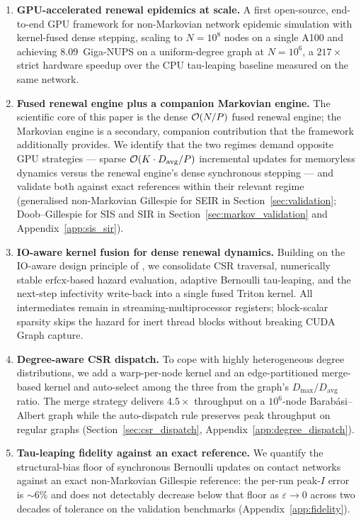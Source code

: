 \begin{enumerate}
    \item \textbf{GPU-accelerated renewal epidemics at scale.} A first open-source, end-to-end GPU framework for non-Markovian network epidemic simulation with kernel-fused dense stepping, scaling to $N = 10^8$ nodes on a single A100 and achieving 8.09~Giga-NUPS on a uniform-degree graph at $N = 10^6$, a $217\times$ strict hardware speedup over the CPU tau-leaping baseline measured on the same network.

    \item \textbf{Fused renewal engine plus a companion Markovian engine.} The scientific core of this paper is the dense $\mathcal{O}(N/P)$ fused renewal engine; the Markovian engine is a secondary, companion contribution that the framework additionally provides. We identify that the two regimes demand opposite GPU strategies --- sparse $\mathcal{O}(K \cdot D_{\mathrm{avg}}/P)$ incremental updates for memoryless dynamics versus the renewal engine's dense synchronous stepping --- and validate both against exact references within their relevant regime (generalised non-Markovian Gillespie for SEIR in Section~\ref{sec:validation}; Doob--Gillespie for SIS and SIR in Section~\ref{sec:markov_validation} and Appendix~\ref{app:sis_sir}).

    \item \textbf{IO-aware kernel fusion for dense renewal dynamics.} Building on the IO-aware design principle of \citet{dao2022flashattention}, we consolidate CSR traversal, numerically stable $\mathrm{erfcx}$-based hazard evaluation, adaptive Bernoulli tau-leaping, and the next-step infectivity write-back into a single fused Triton kernel. All intermediates remain in streaming-multiprocessor registers; block-scalar sparsity skips the hazard for inert thread blocks without breaking CUDA Graph capture.

    \item \textbf{Degree-aware CSR dispatch.} To cope with highly heterogeneous degree distributions, we add a warp-per-node kernel and an edge-partitioned merge-based kernel \citep{merrill2016merge} and auto-select among the three from the graph's $D_{\max}/D_{\mathrm{avg}}$ ratio. The merge strategy delivers $4.5\times$ throughput on a $10^6$-node Barab\'{a}si--Albert graph while the auto-dispatch rule preserves peak throughput on regular graphs (Section~\ref{sec:csr_dispatch}, Appendix~\ref{app:degree_dispatch}).

    \item \textbf{Tau-leaping fidelity against an exact reference.} We quantify the structural-bias floor of synchronous Bernoulli updates on contact networks against an exact non-Markovian Gillespie reference: the per-run peak-$I$ error is $\sim$6\% and does not detectably decrease below that floor as $\varepsilon \to 0$ across two decades of tolerance on the validation benchmarks (Appendix~\ref{app:fidelity}).


\end{enumerate}
